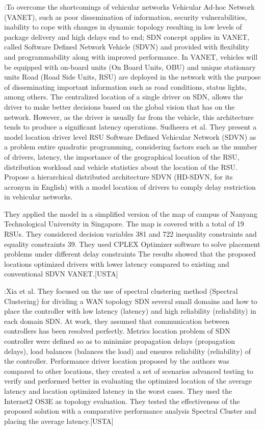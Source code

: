 \documentclass[a4paper,10pt]{article}
\begin{document}
\cite{SuMa18}:To overcome the shortcomings of vehicular networks Vehicular Ad-hoc Network (VANET), such as poor dissemination of information, security vulnerabilities, inability to cope with changes in dynamic topology resulting in low levels of package delivery and high delays end to end; SDN concept applies in VANET, called Software Defined Network Vehicle (SDVN) and provided with flexibility and programmability along with improved performance. In VANET, vehicles will be equipped with on-board units (On Board Units, OBU) and unique stationary units Road (Road Side Units, RSU) are deployed in the network with the purpose of disseminating important information such as road conditions, status lights, among others. The centralized location of a single driver on SDN, allows the driver to make better decisions based on the global vision that has on the network. However, as the driver is usually far from the vehicle, this architecture tends to produce a significant latency operations.
Sudheera et al. They present a model location driver level RSU Software Defined Vehicular Network (SDVN) as a problem entire quadratic programming, considering factors such as the number of drivers, latency, the importance of the geographical location of the RSU, distribution workload and vehicle statistics about the location of the RSU. Propose a hierarchical distributed architecture SDVN (HD-SDVN, for its acronym in English) with a model location of drivers to comply delay restriction in vehicular networks.
 
 
They applied the model in a simplified version of the map of campus of Nanyang Technological University in Singapore. The map is covered with a total of 19 RSUs. They considered decision variables 381 and 722 inequality constraints and equality constraints 39. They used CPLEX Optimizer software to solve placement problems under different delay constraints
The results showed that the proposed locations optimized drivers with lower latency compared to existing and conventional SDVN VANET.[USTA]


\cite{XiQu14}:Xia et al. They focused on the use of spectral clustering method (Spectral Clustering) for dividing a WAN topology SDN several small domains and how to place the controller with low latency (latency) and high reliability (reliability) in each domain SDN. At work, they assumed that communication between controllers has been resolved perfectly. Metrics location problem of SDN controller were defined so as to minimize propagation delays (propagation delays), load balances (balances the load) and ensures reliability (reliability) of the controller.
Performance driver location proposed by the authors was compared to other locations, they created a set of scenarios advanced testing to verify and performed better in evaluating the optimized location of the average latency and location optimized latency in the worst cases. They used the Internet2 OS3E as topology evaluation.
They tested the effectiveness of the proposed solution with a comparative performance analysis Spectral Cluster and placing the average latency.[USTA]
\end{document}
